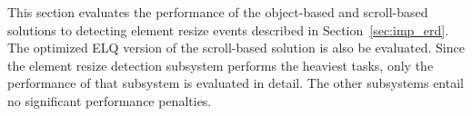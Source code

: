 \documentclass[a4paper,11pt]{kth-mag}
\begin{document}
      
        This section evaluates the performance of the object-based and scroll-based solutions to detecting \gls{element} resize events described in Section~\ref{sec:imp_erd}.
        The optimized \gls{ELQ} version of the scroll-based solution is also be evaluated.
        Since the element resize detection subsystem performs the heaviest tasks, only the performance of that subsystem is evaluated in detail.
        The other subsystems entail no significant performance penalties.
\end{document}
